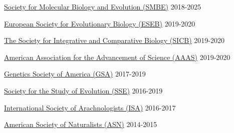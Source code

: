 

\begin{cvmemberships}

  \cvmembership
    {\href{https://smbe.org/}{Society for Molecular Biology and Evolution (SMBE)}} %
    {} %
    {2018-2025} %

  \cvmembership
    {\href{https://eseb.org/}{European Society for Evolutionary Biology (ESEB)}}
    {}
    {2019-2020}

  \cvmembership
    {\href{http://www.sicb.org/}{The Society for Integrative and Comparative Biology (SICB)}} %
    {}   %
    {2019-2020} %

  \cvmembership
    {\href{https://www.aaas.org/}{American Association for the Advancement of Science (AAAS)}} %
    {} %
    {2019-2020} %

  \cvmembership
    {\href{https://genetics-gsa.org/}{Genetics Society of America (GSA)}} %
    {} %
    {2017-2019} %

  \cvmembership
    {\href{https://www.evolutionsociety.org/}{Society for the Study of Evolution (SSE)}} %
    {} %
    {2016-2019} %


  \cvmembership
    {\href{https://arachnology.org/}{International Society of Arachnologists (ISA)}}
    {}
    {2016-2017}

  \cvmembership
     {\href{https://www.amnat.org/}{American Society of Naturalists (ASN)}}
     {}
     {2014-2015}

\end{cvmemberships}
